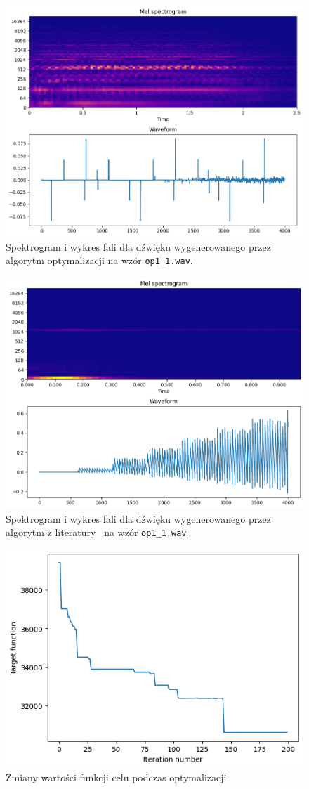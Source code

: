 \begin{figure}[H]
    \centering
    \includegraphics[width=0.7\linewidth]{rys06/evolved_sample_op1.png}
    \caption{
      Spektrogram i wykres fali dla dźwięku wygenerowanego
      przez algorytm optymalizacji na wzór \texttt{op1\_1.wav}.
    }\label{fig:evolved_op1_sound_overview}
\end{figure}


\begin{figure}[H]
    \centering
    \includegraphics[width=0.7\linewidth]{rys06/macret_evolved_op1.png}
    \caption{
      Spektrogram i wykres fali dla dźwięku wygenerowanego
      przez algorytm z literatury~\cite{evolutionary_puredata} na wzór \texttt{op1\_1.wav}.
    }\label{fig:evolved_literature_op1_sound_overview}
\end{figure}

\begin{figure}[H]
    \centering
    \includegraphics[width=0.6\linewidth]{rys06/op1_target_fun_values.png}
    \caption{
      Zmiany wartości funkcji celu podczas optymalizacji.
    }%
\end{figure}

